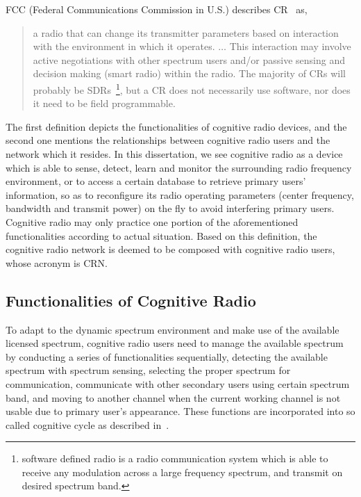 FCC (Federal Communications Commission in U.S.) describes CR~\cite{FCC_03-322} as,
\blockquote{
a radio that can change its transmitter parameters based on interaction with the environment in which it operates. $\ldots$
This interaction may involve active negotiations with other spectrum users and/or passive sensing and decision making (smart radio) within the radio. The majority of CRs will probably be SDRs~\footnote{software defined radio is a radio communication system which is able to receive any modulation across a large frequency spectrum, and transmit on desired spectrum band.}, but a CR does not necessarily use software, nor does it need to be field programmable.
}

The first definition depicts the functionalities of cognitive radio devices, and the second one mentions the relationships between cognitive radio users and the network which it resides.
In this dissertation, we see cognitive radio as a device which is able to sense, detect, learn and monitor the surrounding radio frequency environment, or to access a certain database to retrieve primary users' information, so as to reconfigure its radio operating parameters (\eg center frequency, bandwidth and transmit power) on the fly to avoid interfering primary users.
Cognitive radio may only practice one portion of the aforementioned functionalities according to actual situation.
Based on this definition, the cognitive radio network is deemed to be composed with cognitive radio users, whose acronym is \gls{CRN}.


\subsection{Functionalities of Cognitive Radio}
To adapt to the dynamic spectrum environment and make use of the available licensed spectrum, cognitive radio users need to manage the available spectrum by conducting a series of functionalities sequentially, \ie detecting the available spectrum with spectrum sensing, selecting the proper spectrum for communication, communicate with other secondary users using certain spectrum band, and moving to another channel when the current working channel is not usable due to primary user's appearance.
These functions are incorporated into so called cognitive cycle as described in~\cite{Akyildiz09}.

